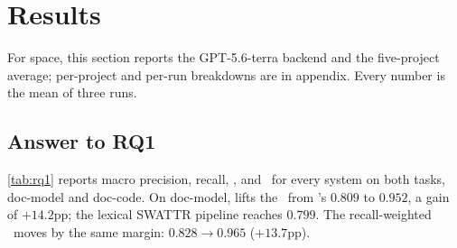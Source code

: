 \section{Results}
\label{sec:results}


 
For space, this section reports the GPT-5.6-terra backend and the five-project average; 
per-project and per-run breakdowns are in appendix.
Every \approach{} number is the mean of three runs.

\subsection{Answer to RQ1}
\label{sec:results:rq1}




\autoref{tab:rq1} reports macro precision, recall, \fone, and \ftwo\ for every system on both tasks, doc-model and doc-code.
On doc-model, \approach{} lifts the \avgfone\ from \Artemis{}'s $0.809$ to $0.952$, a gain of $+14.2$pp; the lexical SWATTR pipeline reaches $0.799$.
The recall-weighted \avgftwo\ moves by the same margin: $0.828 \rightarrow 0.965$ ($+13.7$pp).

